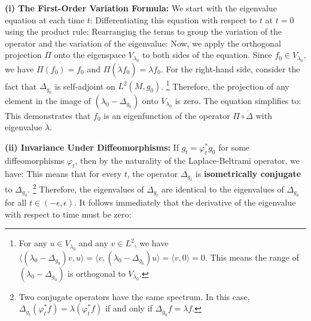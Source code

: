 \begin{solution}
\textbf{(i) The First-Order Variation Formula:}
We start with the eigenvalue equation at each time $t$:
Differentiating this equation with respect to $t$ at $t=0$ using the product rule:
Rearranging the terms to group the variation of the operator and the variation of the eigenvalue:
Now, we apply the orthogonal projection $\Pi$ onto the eigenspace $V_{\lambda_0}$ to both sides of the equation.
Since $f_0 \in V_{\lambda_0}$, we have $\Pi(f_0) = f_0$ and $\Pi(\dot{\lambda} f_0) = \dot{\lambda} f_0$.
For the right-hand side, consider the fact that $\Delta_{g_0}$ is self-adjoint on $L^2(M, g_0)$.
\footnote{For any $u \in V_{\lambda_0}$ and any $v \in L^2$, we have $\langle (\lambda_0 - \Delta_{g_0}) v, u \rangle = \langle v, (\lambda_0 - \Delta_{g_0}) u \rangle = \langle v, 0 \rangle = 0$. This means the range of $(\lambda_0 - \Delta_{g_0})$ is orthogonal to $V_{\lambda_0}$.}
Therefore, the projection of any element in the image of $(\lambda_0 - \Delta_{g_0})$ onto $V_{\lambda_0}$ is zero.
The equation simplifies to:
This demonstrates that $f_0$ is an eigenfunction of the operator $\Pi \circ \dot{\Delta}$ with eigenvalue $\dot{\lambda}$.

\textbf{(ii) Invariance Under Diffeomorphisms:}
If $g_t = \varphi_t^* g_0$ for some diffeomorphisms $\varphi_t$, then by the naturality of the Laplace-Beltrami operator, we have:
This means that for every $t$, the operator $\Delta_{g_t}$ is \textbf{isometrically conjugate} to $\Delta_{g_0}$.
\footnote{Two conjugate operators have the same spectrum. In this case, $\Delta_{g_t} (\varphi_t^* f) = \lambda (\varphi_t^* f)$ if and only if $\Delta_{g_0} f = \lambda f$.}
Therefore, the eigenvalues of $\Delta_{g_t}$ are identical to the eigenvalues of $\Delta_{g_0}$ for all $t \in (-\epsilon, \epsilon)$.
It follows immediately that the derivative of the eigenvalue with respect to time must be zero:
\end{solution}
